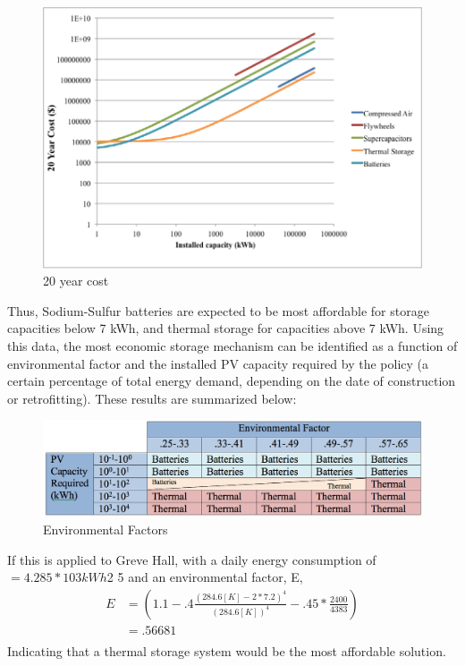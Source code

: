 \begin{figure}
\begin{center}
\includegraphics[scale=0.6]{pics/PatrickFigure5.png}
\caption{20 year cost}
\label{p5}
\end{center}
\end{figure}

Thus, Sodium-Sulfur batteries are expected to be most affordable for storage
capacities below 7 kWh, and thermal storage for capacities above 7 kWh. Using
this data, the most economic storage mechanism can be identified as a function
of environmental factor and the installed PV capacity required by the policy (a
certain percentage of total energy demand, depending on the date of
construction or retrofitting). These results are summarized below:

\begin{figure}
\begin{center}
\includegraphics[scale=0.3]{pics/PatrickTable1.png}
\caption{Environmental Factors}
\label{patrickTable1}
\end{center}
\end{figure}

If this is applied to Greve Hall, with a daily energy consumption of $=4.285*103
kWh$\cite{patrick}{2} \cite{patrick}{5} and an environmental factor, E, 
\begin{equation}
\begin{aligned}
E &=(1.1-.4\frac{(284.6[K]-2*7.2)^4}{(284.6[K])^4}-.45*\frac{2400}{4383})\\
&=.56681\\
\end{aligned}
\end{equation} 
Indicating that a thermal storage system would be the most affordable solution.

